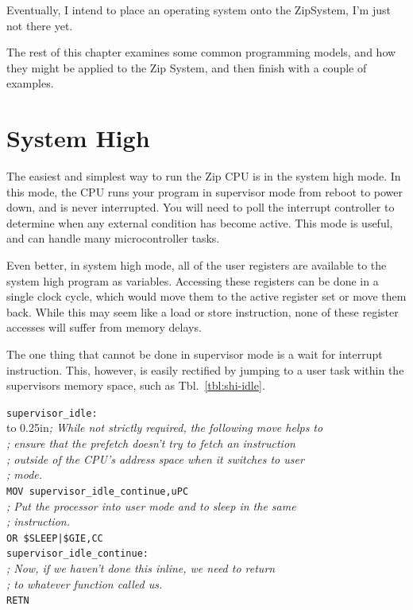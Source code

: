 \documentclass{gqtekspec}
\begin{document}
Eventually, I intend to place an operating system onto the ZipSystem, I'm 
just not there yet.

The rest of this chapter examines some common programming models, and how they
might be applied to the Zip System, and then finish with a couple of examples.

\section{System High}
The easiest and simplest way to run the Zip CPU is in the system high mode.
In this mode, the CPU runs your program in supervisor mode from reboot to
power down, and is never interrupted.  You will need to poll the interrupt
controller to determine when any external condition has become active.  This
mode is useful, and can handle many microcontroller tasks. 

Even better, in system high mode, all of the user registers are available
to the system high program as variables.  Accessing these registers can be
done in a single clock cycle, which would move them to the active register
set or move them back.  While this may seem like a load or store instruction,
none of these register accesses will suffer from memory delays.

The one thing that cannot be done in supervisor mode is a wait for interrupt
instruction.  This, however, is easily rectified by jumping to a user task
within the supervisors memory space, such as Tbl.~\ref{tbl:shi-idle}.
\begin{table}\begin{center}
\begin{tabbing}
{\tt supervisor\_idle:} \\
\hbox to 0.25in{}\={\em ; While not strictly required, the following move helps to} \\
\>	{\em ; ensure that the prefetch doesn't try to fetch an instruction} \\
\>	{\em ; outside of the CPU's address space when it switches to user} \\
\>	{\em ; mode.} \\
\>	{\tt MOV supervisor\_idle\_continue,uPC} \\
\>	{\em ; Put the processor into user mode and to sleep in the same} \\
\>	{\em ; instruction. } \\
\>	{\tt OR \$SLEEP|\$GIE,CC} \\
{\tt supervisor\_idle\_continue:} \\
\>	{\em ; Now, if we haven't done this inline, we need to return} \\
\>	{\em ; to whatever function called us.} \\
\>	{\tt RETN} \\
\end{tabbing}
\caption{Executing an idle from supervisor mode}\label{tbl:shi-idle}
\end{center}\end{table}
\end{document}
